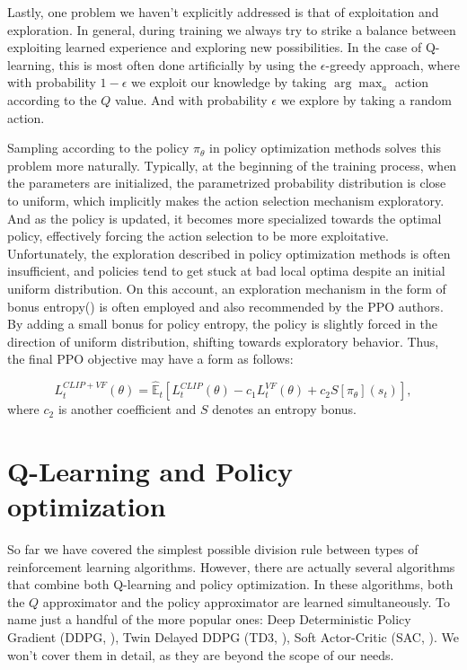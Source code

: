 \pagebreak
Lastly, one problem we haven't explicitly addressed is that of exploitation and exploration.
In general, during training we always try to strike a balance between exploiting learned experience and exploring new possibilities.
In the case of Q-learning, this is most often done artificially by using the $\epsilon$-greedy approach, where with probability $1-\epsilon$ we exploit our knowledge by taking $\arg \max_a$ action according to the $Q$ value.
And with probability $\epsilon$ we explore by taking a random action.

Sampling according to the policy $\pi_\theta$ in policy optimization methods solves this problem more naturally.
Typically, at the beginning of the training process, when the parameters are initialized, the parametrized probability distribution is close to uniform, which implicitly makes the action selection mechanism exploratory.
And as the policy is updated, it becomes more specialized towards the optimal policy, effectively forcing the action selection to be more exploitative.
Unfortunately, the exploration described in policy optimization methods is often insufficient, and policies tend to get stuck at bad local optima despite an initial uniform distribution.
On this account, an exploration mechanism in the form of bonus entropy(\cite{EntropyRegularization}) is often employed and also recommended by the PPO authors.
By adding a small bonus for policy entropy, the policy is slightly forced in the direction of uniform distribution, shifting towards exploratory behavior.
Thus, the final PPO objective may have a form as follows:

\[
  L_t^{CLIP+VF}(\theta) =   \hat{\mathbb{E}}_t \left[L_t^{CLIP}(\theta) - c_1 L_t^{VF}(\theta)  + c_2S[\pi_\theta](s_t)\right],
\]
where $c_2$ is another coefficient and $S$ denotes an entropy bonus.


\section*{Q-Learning and Policy optimization}\label{QPlusPolicy}
So far we have covered the simplest possible division rule between types of reinforcement learning algorithms.
However, there are actually several algorithms that combine both Q-learning and policy optimization.
In these algorithms, both the $Q$ approximator and the policy approximator are learned simultaneously.
To name just a handful of the more popular ones: Deep Deterministic Policy Gradient (DDPG, \cite{DDPG}), Twin Delayed DDPG (TD3, \cite{TD3}), Soft Actor-Critic (SAC, \cite{SAC}).
We won't cover them in detail, as they are beyond the scope of our needs.




